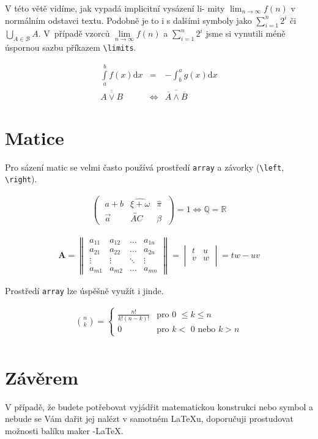 \documentclass[11pt, a4paper, twocolumn]{article}
\begin{document}
V této větě vidíme, jak vypadá implicitní vysázení li-
mity $\lim_{n\to\infty} f(n)$ v normálním odstavci textu. Podobně
je to i s dalšími symboly jako  $\sum_{i=1}^{n} 2^i$ či  $\bigcup_{A\in\mathcal{B}} A$. V~případě vzorců $\lim\limits_{n\to\infty} f(n)$ a   $\sum\limits_{i=1}^{n} 2^i$ jsme si vynutili méně úspornou sazbu příkazem \verb|\limits|.

\begin{eqnarray}
    \int\limits_{a}^{b} f(x) \mathrm{d}x & = & - \int_{b}^{a} g(x) \mathrm{d}x
    \\
    \overline{\overline{A \lor B}} & \Leftrightarrow & \overline{\overline{A} \land \overline{B}}
\end{eqnarray}

\section{Matice}
Pro sázení matic se velmi často používá prostředí \verb|array| a závorky (\verb|\left|, \verb|\right|).

\newpage
\begin{eqnarray*}
\begin{pmatrix} 
\;a + b & \widehat{\xi + \omega} & \hat{\pi}\;\\
\;\vec{a} & \overleftrightarrow{AC} & \beta\; 
\end{pmatrix} = 1 \iff \mathbb{Q} = \mathbb{R}
\end{eqnarray*}

\begin{eqnarray*}
\mathrm{\textbf{A}} =
\begin{Vmatrix}
    a_{11} & a_{12} & \dots  & a_{1n}\\
    a_{21} & a_{22} & \dots  & a_{2n}\\
    \vdots & \vdots & \ddots & \vdots\\
    a_{m1} & a_{m2} & \dots  & a_{mn}
\end{Vmatrix}
=
\begin{vmatrix}
     t & u\\
     v & w\\
\end{vmatrix}
=tw\!-\!uv
\end{eqnarray*}


Prostředí \verb|array| lze úspěšně využít i jinde.

\begin{eqnarray*}
\binom{n}{k} = \left\{ \begin{array}{ll}
         \frac{n!}{k!(n-k)!} & \mbox{pro 0 $\leq k \leq n$}\\
        0 & \mbox{pro $k <$ 0 nebo $k > n$}\end{array} \right.
    \\
\end{eqnarray*}

\section{Závěrem}
V případě, že budete potřebovat vyjádřit matematickou konstrukci nebo symbol a nebude se Vám dařit jej nalézt v samotném \LaTeX u, doporučuji prostudovat možnosti balíku maker \AmS-\LaTeX.
\end{document}

